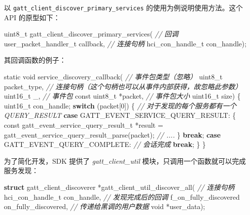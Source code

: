 \documentclass[
  12pt,
]{book}
\newenvironment{Shaded}{\begin{snugshade}}{\end{snugshade}}
\newcommand{\CommentTok}[1]{\textcolor[rgb]{0.56,0.35,0.01}{\textit{#1}}}
\newcommand{\ControlFlowTok}[1]{\textcolor[rgb]{0.13,0.29,0.53}{\textbf{#1}}}
\newcommand{\DataTypeTok}[1]{\textcolor[rgb]{0.13,0.29,0.53}{#1}}
\newcommand{\DecValTok}[1]{\textcolor[rgb]{0.00,0.00,0.81}{#1}}
\newcommand{\KeywordTok}[1]{\textcolor[rgb]{0.13,0.29,0.53}{\textbf{#1}}}
\newcommand{\NormalTok}[1]{#1}
\begin{document}
以 \texttt{gatt\_client\_discover\_primary\_services} 的使用为例说明使用方法。这个 API 的原型如下：

\begin{Shaded}
\begin{Highlighting}[]
\DataTypeTok{uint8_t}\NormalTok{ gatt_client_discover_primary_services(}
  \CommentTok{// 回调}
\NormalTok{  user_packet_handler_t callback,}
  \CommentTok{// 连接句柄}
\NormalTok{  hci_con_handle_t con_handle);}
\end{Highlighting}
\end{Shaded}

其回调函数的例子：

\begin{Shaded}
\begin{Highlighting}[]
\DataTypeTok{static} \DataTypeTok{void}\NormalTok{ service_discovery_callback(}
  \CommentTok{// 事件包类型（忽略）}
  \DataTypeTok{uint8_t}\NormalTok{ packet_type,}
  \CommentTok{// 连接句柄（这个句柄也可以从事件内部获得，故忽略此参数）}
  \DataTypeTok{uint16_t}\NormalTok{ _,}
  \CommentTok{// 事件包}
  \DataTypeTok{const} \DataTypeTok{uint8_t}\NormalTok{ *packet,}
  \CommentTok{// 事件包大小}
  \DataTypeTok{uint16_t}\NormalTok{ size)}
\NormalTok{\{}
    \DataTypeTok{uint16_t}\NormalTok{ con_handle;}
    \ControlFlowTok{switch}\NormalTok{ (packet[}\DecValTok{0}\NormalTok{])}
\NormalTok{    \{}
    \CommentTok{// 对于发现的每个服务都有一个 QUERY_RESULT}
    \ControlFlowTok{case}\NormalTok{ GATT_EVENT_SERVICE_QUERY_RESULT:}
\NormalTok{        \{}
            \DataTypeTok{const}\NormalTok{ gatt_event_service_query_result_t *result =}
\NormalTok{                gatt_event_service_query_result_parse(packet);}
            \CommentTok{// ....}
\NormalTok{        \}}
        \ControlFlowTok{break}\NormalTok{;}
    \ControlFlowTok{case}\NormalTok{ GATT_EVENT_QUERY_COMPLETE:}
        \CommentTok{// 会话完成}
        \ControlFlowTok{break}\NormalTok{;}
\NormalTok{    \}}
\NormalTok{\}}
\end{Highlighting}
\end{Shaded}

为了简化开发，SDK 提供了 \emph{gatt\_client\_util} 模块，只调用一个函数就可以完成服务发现：

\begin{Shaded}
\begin{Highlighting}[]
\KeywordTok{struct}\NormalTok{ gatt_client_discoverer *gatt_client_util_discover_all(}
    \CommentTok{// 连接句柄}
\NormalTok{    hci_con_handle_t con_handle,}
    \CommentTok{// 发现完成后的回调}
\NormalTok{    f_on_fully_discovered on_fully_discovered,}
    \CommentTok{// 传递给黑调的用户数据}
    \DataTypeTok{void}\NormalTok{ *user_data);}
\end{Highlighting}
\end{Shaded}
\end{document}
